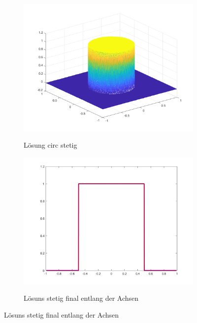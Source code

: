 \begin{figure}[p]
  \centering
  \begin{subfigure}[b]{.48\linewidth}
    \centering
    \caption{Lösung circ stetig}
    \includegraphics[trim = 40 30 30 30, clip, width=\linewidth]
      {pictures/chapExperiments/secGrayscale/circ/cont/adaptive/lvl28/solution.png}
    \label{fig:circContSol}
  \end{subfigure}
  \quad
  \begin{subfigure}[b]{.48\linewidth}
    \centering
    \caption{Lösuns stetig final entlang der Achsen}
    \includegraphics[trim = 50 30 50 20, clip, width=\linewidth]
      {pictures/chapExperiments/secGrayscale/circ/cont/adaptive/lvl28/solutionAxis.png}
    \label{fig:circContSolAxis}
  \end{subfigure}


\end{figure}
